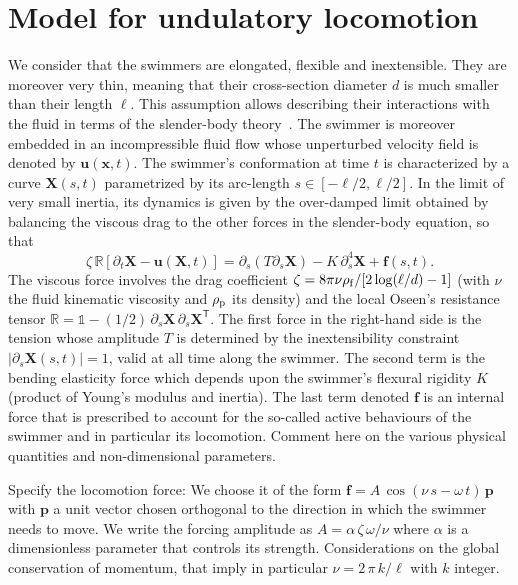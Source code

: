 \documentclass[prl,aps,superscriptaddress,twocolumn]{revtex4-1}
\newcommand{\bX}{\bm X}
\newcommand{\bu}{\bm u}
\newcommand{\bF}{\bm f}
\begin{document}
\section{Model for undulatory locomotion}
We consider that the swimmers are elongated, flexible and inextensible. They are moreover very thin, meaning that their cross-section diameter $d$ is much smaller than their length $\ell$. This assumption allows describing their interactions with the fluid in terms of the slender-body theory~\cite{lindner2015elastic}. The swimmer is moreover embedded in an incompressible fluid flow whose unperturbed velocity field is denoted by $\bu(\boldsymbol{x},t)$. The swimmer's conformation at time $t$ is characterized by a curve $\bX(s,t)$ parametrized by its arc-length $s\in[-\ell/2,\ell/2]$. In the limit of very small inertia, its dynamics is given by the over-damped limit obtained by balancing the viscous drag to the other forces in the slender-body equation, so that
\begin{equation}
  \zeta\,\mathbb{R}\left[\partial_t \bX-\bu(\bX,t)\right] = \partial_s(T\partial_s \bX) - K\,\partial_s^4 \bX + \bF(s,t).
  \label{eq:vel_fib}
\end{equation}
The viscous force involves the drag coefficient $\zeta = 8\pi\nu\rho_{\rm f}/[2\log(\ell/d)-1]$ (with $\nu$ the fluid kinematic viscosity and $\rho_{\rm p}$ its density) and the local Oseen's resistance tensor $\mathbb{R} = \mathbb{1} -(1/2)\,\partial_s\bX\,\partial_s\bX^{\mathsf{T}}$. The first force in the right-hand side is the tension whose amplitude $T$ is determined by the inextensibility constraint $|\partial_s\bm X(s,t)| = 1$, valid at all time along the swimmer. The second term is the bending elasticity force which depends upon the swimmer's flexural rigidity $K$ (product of Young's modulus and inertia). The last term denoted $\bF$ is an internal force that is prescribed to account for the so-called active behaviours of the swimmer and in particular its locomotion. Comment here on the various physical quantities and non-dimensional parameters.

Specify the locomotion force: We choose it of the form $\bF = A\,\cos(\nu\,s-\omega\,t)\,\bm p$ with $\bm p$ a unit vector chosen orthogonal to the direction  in which the swimmer needs to move. We write the forcing amplitude as $A = \alpha\,\zeta\,\omega/\nu$ where $\alpha$ is a dimensionless parameter that controls its strength. Considerations on the global conservation of momentum, that imply in particular $\nu = 2\,\pi\,k/\ell$ with $k$ integer.
\end{document}
